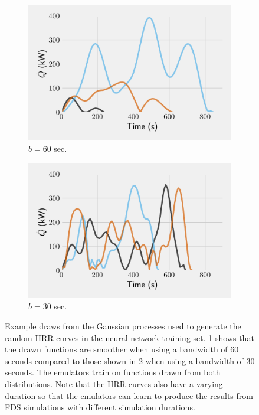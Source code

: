 \documentclass{article}
\begin{document}
\begin{figure}[htbp]
  \centering
  \begin{subfigure}[t]{.45\textwidth}
      \centering
      \includegraphics[width=\textwidth,keepaspectratio]{figures/gp_nn_training_smooth.pdf}
      \caption{ $b=60$ sec.}
      \label{fig:gp_nn_training_smooth}
  \end{subfigure}
  \begin{subfigure}[t]{.45\textwidth}
      \centering
      \includegraphics[width=\textwidth ,keepaspectratio]{figures/gp_nn_training_wiggly.pdf}
      \caption{ $b=30$ sec.}
      \label{fig:gp_nn_training_wiggly}
  \end{subfigure}
  \caption{Example draws from the Gaussian processes used to generate the random HRR curves in the neural network training set. \protect\ref{fig:gp_nn_training_smooth} shows that the drawn functions are smoother when using a bandwidth of 60 seconds compared to those shown in \protect\ref{fig:gp_nn_training_wiggly} when using a bandwidth of 30 seconds. The emulators train on functions drawn from both distributions. Note that the HRR curves also have a varying duration so that the emulators can learn to produce the results from FDS simulations with different simulation durations.} 
  \label{fig:gp_nn_training}
\end{figure}
\end{document}
